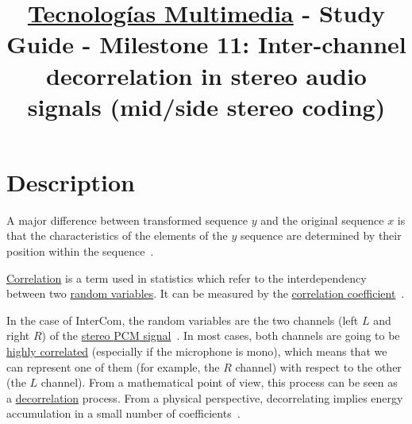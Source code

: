 \title{\href{https://www.ual.es/estudios/grados/presentacion/plandeestudios/asignatura/4015/40154321?idioma=zh_CN}{Tecnologías Multimedia} - Study Guide - Milestone 11: Inter-channel decorrelation in stereo audio signals (mid/side stereo coding)}

\maketitle

\section{Description}

A major difference between transformed sequence $y$ and the original
sequence $x$ is that the characteristics of the elements of the $y$
sequence are determined by their position within the
sequence~\cite{sayood2017introduction}.

\href{https://en.wikipedia.org/wiki/Correlation_and_dependence}{Correlation}
is a term used in statistics which refer to the interdependency
between two \href{https://en.wikipedia.org/wiki/Random_variable}{random
  variables}. It can be measured by the
\href{https://www.mathsisfun.com/data/correlation.html}{correlation
  coefficient}~\cite{thinkstats}.

In the case of InterCom, the random variables are the two channels
(left $L$ and right $R$) of the
\href{https://en.wikipedia.org/wiki/Stereophonic_sound}{stereo
  \href{https://en.wikipedia.org/wiki/Pulse-code_modulation}{PCM}
  signal}~\cite{bosi2003intro}. In most cases, both channels are going
to be \href{https://en.wikipedia.org/wiki/Binaural_recording}{highly
  correlated} (especially if the microphone is mono), which means that
we can represent one of them (for example, the $R$ channel) with
respect to the other (the $L$ channel). From a mathematical point of
view, this process can be seen as a
\href{https://en.wikipedia.org/wiki/Decorrelation}{decorrelation}
process. From a physical perspective, decorrelating implies energy
accumulation in a small number of coefficients~\cite{sayood2017introduction}.

